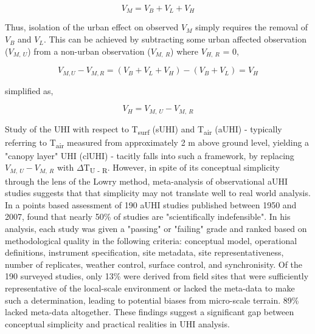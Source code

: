 \begin{bibunit}
\begin{equation}
	V_M = V_B + V_L + V_H
\end{equation}

Thus, isolation of the urban effect on observed $V_M$ simply requires the removal of $V_B$ and $V_L$. This can be achieved by subtracting some urban affected observation ($V_{M, \ U}$) from a non-urban observation ($V_{M, \ R}$) where $V_{H, \ R}$ = 0,

\begin{equation}
V_{M, U} - V_{M, R} = (V_B + V_L + V_H) - (V_B + V_L) = V_H
\end{equation}

\noindent simplified as,

\begin{equation}
	V_H = V_{M, \ U} - V_{M, \ R}
\end{equation}

Study of the UHI with respect to T\textsubscript{surf} (sUHI) and T\textsubscript{air} (aUHI) - typically referring to T\textsubscript{air} measured from approximately 2 \si{\meter} above ground level, yielding a "canopy layer" UHI (clUHI) - tacitly falls into such a framework, by replacing $V_{M, \ U} - V_{M, \ R}$ with $\Delta$T\textsubscript{U - R}. However, in spite of its conceptual simplicity through the lens of the Lowry method, meta-analysis of observational aUHI studies suggests that that simplicity may not translate well to real world analysis. In a points based assessment of 190 aUHI studies published between 1950 and 2007, \citet{Stewart2011} found that nearly 50\% of studies are "scientifically indefensible". In his analysis, each study was given a "passing" or "failing" grade and ranked based on methodological quality in the following criteria: conceptual model, operational definitions, instrument specification, site metadata, site representativeness, number of replicates, weather control, surface control, and synchronisity. Of the 190 surveyed studies, only 13\% were derived from field sites that were sufficiently representative of the local-scale environment or lacked the meta-data to make such a determination, leading to potential biases from micro-scale terrain. 89\% lacked meta-data altogether. These findings suggest a significant gap between conceptual simplicity and practical realities in UHI analysis.


\end{bibunit}
